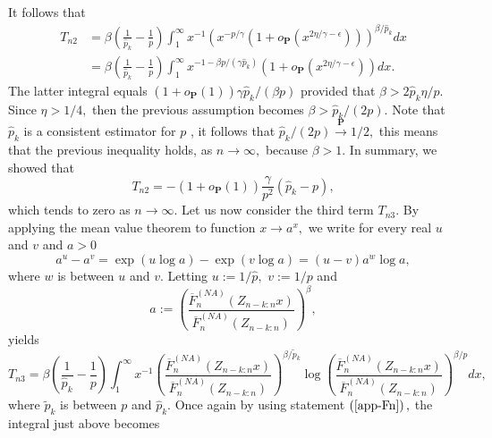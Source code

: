 \documentclass[reqno,openbib,runningheads,a4paper,12pt]{amsart}%
\begin{document}
It follows that%
\begin{align*}
T_{n2}  &  =\beta\left(  \frac{1}{\widehat{p}_{k}}-\frac{1}{p}\right)
\int_{1}^{\infty}x^{-1}\left(  x^{-p/\gamma}\left(  1+o_{\mathbf{P}}\left(
x^{2\eta/\gamma-\epsilon}\right)  \right)  \right)  ^{\beta/\widehat{p}_{k}%
}dx\\
&  =\beta\left(  \frac{1}{\widehat{p}_{k}}-\frac{1}{p}\right)  \int%
_{1}^{\infty}x^{-1-\beta p/\left(  \gamma\widehat{p}_{k}\right)  }\left(
1+o_{\mathbf{P}}\left(  x^{2\eta/\gamma-\epsilon}\right)  \right)  dx.
\end{align*}
The latter integral equals $\left(  1+o_{\mathbf{P}}\left(  1\right)  \right)
\gamma\widehat{p}_{k}/\left(  \beta p\right)  $ provided that $\beta
>2\widehat{p}_{k}\eta/p.$ Since $\eta>1/4,$ then the previous assumption
becomes $\beta>\widehat{p}_{k}/\left(  2p\right)  .$ Note that $\widehat{p}%
_{k}$ is a consistent estimator for $p$ \citep[see, e.g.,] []{EnFG08}, it
follows that $\widehat{p}_{k}/\left(  2p\right)  \overset{\mathbf{P}%
}{\rightarrow}1/2,$ this means that the previous inequality holds, as
$n\rightarrow\infty,$ because $\beta>1.$ In summary, we showed that
\[
T_{n2}=-\left(  1+o_{\mathbf{P}}\left(  1\right)  \right)  \frac{\gamma}%
{p^{2}}\left(  \widehat{p}_{k}-p\right)  ,
\]
which tends to zero as $n\rightarrow\infty.$ Let us now consider the third
term $T_{n3}.$ By applying the mean value theorem to function $x\rightarrow
a^{x},$ we write for every real $u$ and $v$ and $a>0$%
\[
a^{u}-a^{v}=\exp\left(  u\log a\right)  -\exp\left(  v\log a\right)  =\left(
u-v\right)  a^{w}\log a,
\]
where $w$ is between $u$ and $v.$ Letting $u:=1/\widehat{p},$ $v:=1/p$ and%
\[
a:=\left(  \frac{\overline{F}_{n}^{\left(  NA\right)  }\left(  Z_{n-k:n}%
x\right)  }{\overline{F}_{n}^{\left(  NA\right)  }\left(  Z_{n-k:n}\right)
}\right)  ^{\beta},
\]
yields
\[
T_{n3}=\beta\left(  \frac{1}{\widehat{p}_{k}}-\frac{1}{p}\right)  \int%
_{1}^{\infty}x^{-1}\left(  \frac{\overline{F}_{n}^{\left(  NA\right)  }\left(
Z_{n-k:n}x\right)  }{\overline{F}_{n}^{\left(  NA\right)  }\left(
Z_{n-k:n}\right)  }\right)  ^{\beta/\widetilde{p}_{k}}\log\left(
\frac{\overline{F}_{n}^{\left(  NA\right)  }\left(  Z_{n-k:n}x\right)
}{\overline{F}_{n}^{\left(  NA\right)  }\left(  Z_{n-k:n}\right)  }\right)
^{\beta/p}dx,
\]
where $\widetilde{p}_{k}$ is between $p$ and $\widehat{p}_{k}.$ Once again by
using statement $\left(  \ref{app-Fn}\right)  ,$ the integral just above
becomes%
\end{document}
